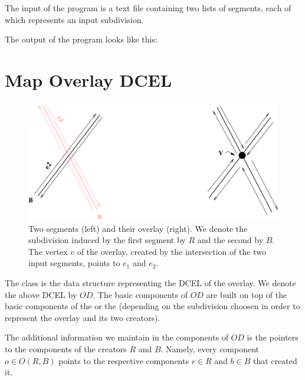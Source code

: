 The input of the program is a text file containing two lists of segments, 
each of which represents an input subdivision.

The output of the program looks like this:

\section{Map Overlay DCEL}
\label{sec:dcel}

\begin{figure}[h]
    \begin{ccTexOnly}
        \centerline{
           \includegraphics{Map_overlay_2/simple_overlay}
           }
    \end{ccTexOnly}
\caption{Two segments (left) and their overlay (right). 
We denote the subdivision induced by the first segment by $R$ and the second by $B$. 
The vertex $v$ of the overlay, created by the intersection of the two input segments, 
points to $e_1$ and $e_2$.}
\label{fig:simple_overlay_example}
\end{figure}

The 
class is the data structure representing the DCEL of the overlay. 
We denote the above DCEL by $OD$.
The basic components of $OD$ are built 
on top of the basic components of the  or 
the  
(depending on the subdivision choosen in 
order to represent the overlay and its two creators).

The additional information we maintain in the components of $OD$ 
is the pointers to the components of the creators $R$ and $B$.
Namely, every component $o \in O(R,B)$ points to the 
respective components $r \in R$ and $b \in B$ that created it. 

